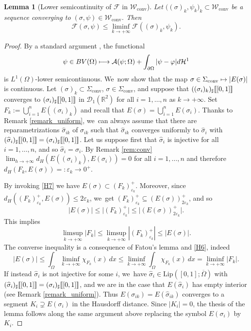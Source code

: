 \documentclass[JEP,XML,SOM,Unicode, NoFloatCountersInSection,published]{cedram}
\newcommand\mto{\mathchoice{\longmapsto}{\mapsto}{\mapsto}{\mapsto}}
\newcommand{\R}{\mathbb{R}}
\let\curves\Sigma
\let\eps\varepsilon
\let\Om\Omega
\newcommand\admclassconv{{\mathcal W_\mathrm{conv}}}
\newcommand\convexcurves{\curves_\mathrm{conv}}
\newcommand{\jump}[1]{\textup{\textlbrackdbl}{#1}\textup{\textrbrackdbl}}
\newcommand{\Lip}{\mathrm{Lip}}
\newtheorem{lemma}[theorem]{Lemma}
\theoremstyle{definition}
\begin{document}
\begin{lemma}[Lower semicontinuity of $\mathcal F$ in $\admclassconv$]
\label{lem:lower_semicontinuity_of_F}
Let $\big((\sigma)_k,\psi_k\big)_k\subset\admclassconv$ be a sequence converging
to $(\sigma,\psi)\in \admclassconv$. Then
\begin{equation*}
\mathcal{F}(\sigma,\psi)\le\liminf_{k\to+\infty}\mathcal{F}((\sigma)_k,\psi_k).
\end{equation*}
\end{lemma}
\begin{proof}
By a standard argument \cite{Giusti:84}, the functional
\begin{equation*}
\psi\in BV(\Om)\mto \mathcal{A}(\psi;\Om)+\int_{\partial\Om}|\psi-\varphi|d\mathcal H^1
\end{equation*}
is $L^1(\Om)$-lower semicontinuous. We~now show that the map $\sigma \in
\convexcurves
\mto|E(\sigma)|$
is continuous.
Let $(\sigma)_k \subset \convexcurves$,
$\sigma \in\convexcurves$, and suppose that
$((\sigma_{i})_k)_\sharp\jump{[0,1]}$ converges to $(\sigma_i)_\sharp\jump{[0,1]}$ in $\mathcal D_1(\R^2)$
for all $i=1,\dots,n$ as $k \to +\infty$.
Set $F_k:=\bigcup_{i=1}^n E((\sigma_{i})_k)$ and recall that
$E(\sigma)=\bigcup_{i=1}^n E(\sigma_{i})$. { Thanks to Remark \ref{remark_uniform}, we~can always assume that there are reparametrizations $\widehat\sigma_{ik}$ of $\sigma_{ik}$ such that $\widehat\sigma_{ik}$ converges uniformly to $\widehat \sigma_i$ with $(\widehat \sigma_i)_\sharp\jump{[0,1]}=(\sigma_i)_\sharp\jump{[0,1]}$. Let us suppose first that $\widehat \sigma_i$ is injective for all $i=1,\dots,n$, and so $\widehat\sigma_i=\sigma_i$.}
By Remark \ref{rem:conv}
$\lim_{h \to +\infty} d_H(E((\sigma_{i})_k),E(\sigma_i)) = 0$
for all $i=1,\dots,n$ and therefore $d_H(F_k,E(\sigma)) =: \eps_k\to 0^+$.

By invoking \ref{H7} we have $E(\sigma)\subset (F_k)^+_{\eps_k}$.
Moreover, since $d_H((F_k)_{\eps_k}^+,E(\sigma))\leq 2\eps_k$, we~get $(F_k)^+_{\eps_k}\subseteq (E(\sigma))_{2\eps_k}^+$, and so
\begin{equation*}
\vert E(\sigma)\vert\le \vert (F_k)^+_{\eps_k}\vert
\le \vert (E(\sigma))_{2\eps_k}^+\vert.
\end{equation*}
This implies
\[
\limsup_{k\to+\infty} |F_k|\leq \limsup_{k\to+\infty} |(F_k)^+_{\eps_k}|\le\mathcal |E(\sigma)|.
\]
The converse inequality is a consequence of Fatou's lemma and \ref{H6}, indeed
\[
|E(\sigma)|\leq \int_\Om\liminf_{k\to+\infty}{\chi_{F_k}(x)}~dx\leq\liminf_{k\to+\infty}\int_\Om{\chi_{F_k}(x)}~dx =\liminf_{k\to+\infty}|F_k|.
\]
If instead $\widehat\sigma_i$ is not injective for some $i$, we~have $\widehat \sigma_i\in\Lip([0,1];\overline\Om)$ with $(\widehat \sigma_i)_\sharp\jump{[0,1]}=(\sigma_i)_\sharp\jump{[0,1]}$, and we are in the case that $E(\widehat\sigma_i)$ has empty interior (see Remark \ref{remark_uniform}). Thus $ E(\sigma_{ik})=E(\widehat\sigma_{ik})$ converges to a segment $K_i\supsetneq E(\sigma_i)$ in the Hausdorff distance.
Since $|K_i|=0$, the thesis of the lemma follows along the same argument above replacing the symbol $E(\sigma_i)$ by $K_i$.
\end{proof}
\end{document}

